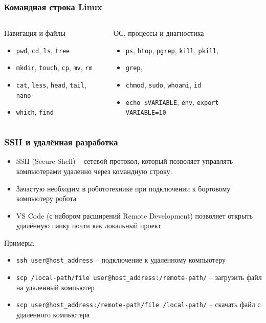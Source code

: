 \documentclass[aspectratio=169]{beamer}
\newcommand{\term}[1]{{\large\textcolor{HSEblue}{#1}}}
\newcommand{\cmd}[1]{\texttt{#1}}
\begin{document}
\begin{frame}[fragile]
\frametitle{Командная строка Linux}
\begin{columns}[T]
\begin{block}{Навигация и файлы}
	\begin{itemize}
	\item \cmd{pwd}, \cmd{cd}, \cmd{ls},  \cmd{tree}
	\item \cmd{mkdir}, \cmd{touch}, \cmd{cp}, \cmd{mv}, \cmd{rm}
	\item \cmd{cat}, \cmd{less}, \cmd{head}, \cmd{tail}, \cmd{nano}
	\item \cmd{which}, \cmd{find} 
\end{itemize}
\end{block}
\begin{block}{ОС, процессы и диагностика}
	\begin{itemize}
	\item \cmd{ps}, \cmd{htop}, \cmd{pgrep}, \cmd{kill}, \cmd{pkill}, 
	\item \cmd{grep}, 
	\item \cmd{chmod}, \cmd{sudo}, \cmd{whoami}, \cmd{id}
	\item \cmd{echo \$VARIABLE}, \cmd{env}, \cmd{export VARIABLE=10}
\end{itemize}
\end{block}

\end{columns}
\vfill
\end{frame}

\begin{frame}[fragile]
\frametitle{SSH и удалённая разработка}
\begin{itemize}
	\item \term{SSH (Secure Shell)} -- сетевой протокол, который позволяет управлять компьютерами удаленно через командную строку.
	\item Зачастую необходим в робототехнике при подключении к бортовому компьютеру робота
	\item VS Code (с набором расширений Remote Development) позволяет открыть удалённую папку почти как локальный проект.
\end{itemize}
\vfill
\begin{block}{Примеры:}
\begin{itemize}
\item \cmd{ssh user@host\_address} -- подключение к удаленному компьютеру\\
\item \cmd{scp /local-path/file user@host\_address:/remote-path/} -- загрузить файл на удаленный компьютер\\
\item \cmd{scp user@host\_address:/remote-path/file /local-path/} -- скачать файл с удаленного компьютера
\end{itemize}

\end{block}
\end{frame}
\end{document}
